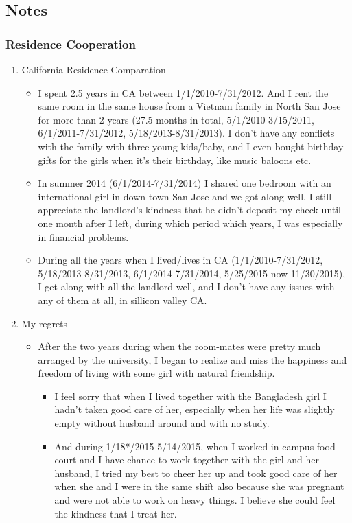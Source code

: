 \documentclass[9pt,b5paper]{article}
\begin{document}
\subsection{Notes}
\label{sec-2-4}
\subsubsection{Residence Cooperation}
\label{sec-2-4-1}
\begin{enumerate}
\item California Residence Comparation
\label{sec-2-4-1-1}
\begin{itemize}
\item I spent 2.5 years in CA between 1/1/2010-7/31/2012. And I rent the same room in the same house from a Vietnam family in North San Jose for more than 2 years (27.5 months in total, 5/1/2010-3/15/2011, 6/1/2011-7/31/2012, 5/18/2013-8/31/2013). I don't have any conflicts with the family with three young kids/baby, and I even bought birthday gifts for the girls when it's their birthday, like music baloons etc.
\item In summer 2014 (6/1/2014-7/31/2014) I shared one bedroom with an international girl in down town San Jose and we got along well. I still appreciate the landlord's kindness that he didn't deposit my check until one month after I left, during which period which years, I was especially in financial problems.
\item During all the years when I lived/lives in CA (1/1/2010-7/31/2012, 5/18/2013-8/31/2013, 6/1/2014-7/31/2014, 5/25/2015-now 11/30/2015), I get along with all the landlord well, and I don't have any issues with any of them at all, in sillicon valley CA.
\end{itemize}
\item My regrets
\label{sec-2-4-1-2}
\begin{itemize}
\item After the two years during when the room-mates were pretty much arranged by the university, I began to realize and miss the happiness and freedom of living with some girl with natural friendship. 
\begin{itemize}
\item I feel sorry that when I lived together with the Bangladesh girl I hadn't taken good care of her, especially when her life was slightly empty without husband around and with no study.
\item And during 1/18*/2015-5/14/2015, when I worked in campus food court and I have chance to work together with the girl and her husband, I tried my best to cheer her up and took good care of her when she and I were in the same shift also because she was pregnant and were not able to work on heavy things. I believe she could feel the kindness that I treat her.
\end{itemize}
\end{itemize}
\end{enumerate}
\end{document}
